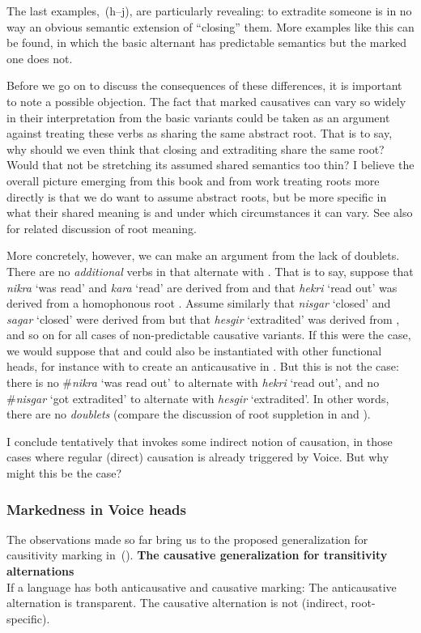 The last examples,~(\lastx h--j), are particularly revealing: to extradite someone is in no way an obvious semantic extension of ``closing'' them. More examples like this can be found, in which the basic alternant has predictable semantics but the marked one does not.

Before we go on to discuss the consequences of these differences, it is important to note a possible objection. The fact that marked causatives can vary so widely in their interpretation from the basic variants could be taken as an argument against treating these verbs as sharing the same abstract root. That is to say, why should we even think that closing and extraditing share the same root? Would that not be stretching its assumed shared semantics too thin? I believe the overall picture emerging from this book and from work treating roots more directly is that we do want to assume abstract roots, but be more specific in what their shared meaning is and under which circumstances it can vary. See also \cite{kastnertucker19cup} for related discussion of root meaning.

More concretely, however, we can make an argument from the lack of doublets. There are no \emph{additional} verbs in {\tnif} that alternate with {\thif}. That is to say, suppose that \emph{nikra} `was read' and \emph{kara} `read' are derived from  and that \emph{hekri} `read out' was derived from a homophonous root . Assume similarly that \emph{nisgar} `closed' and \emph{sagar} `closed' were derived from  but that \emph{hesgir} `extradited' was derived from , and so on for all cases of non-predictable causative variants. If this were the case, we would suppose that  and  could also be instantiated with other functional heads, for instance with {\vz} to create an anticausative in {\tnif}. But this is not the case: there is no \#\emph{nikra} `was read out' to alternate with \emph{hekri} `read out', and no \#\emph{nisgar} `got extradited' to alternate with \emph{hesgir} `extradited'. In other words, there are no \emph{doublets} (compare the discussion of root suppletion in \citealt{harley14thlia,harley14thlib,harley15roots} and \citealt{borer14thli}).

I conclude tentatively that {\vd} invokes some indirect notion of causation, in those cases where regular (direct) causation is already triggered by Voice. But why might this be the case?

			\subsubsection{Markedness in Voice heads} \label{vd:caus:markvoice}
The observations made so far bring us to the proposed generalization for causitivity marking in~(\nextx).
\pex\label{ex:vd:causgen}\textbf{The causative generalization for transitivity alternations}\\
	If a language has both anticausative and causative marking:
	\a The anticausative alternation is transparent.
	\a The causative alternation is not (indirect, root-specific).
\xe

